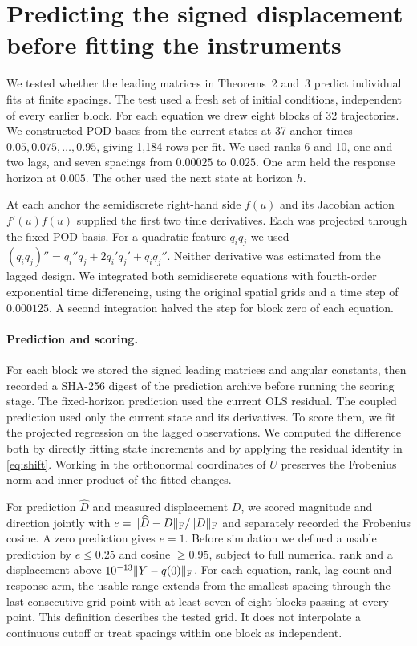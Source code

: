 \section{Predicting the signed displacement before fitting the instruments}
We tested whether the leading matrices in Theorems~2 and~3 predict individual fits at finite spacings. The test used a fresh set of initial conditions, independent of every earlier block. For each equation we drew eight blocks of 32 trajectories. We constructed POD bases from the current states at 37 anchor times $0.05,0.075,\ldots,0.95$, giving 1,184 rows per fit. We used ranks 6 and 10, one and two lags, and seven spacings from $0.00025$ to $0.025$. One arm held the response horizon at $0.005$. The other used the next state at horizon $h$.

At each anchor the semidiscrete right-hand side $f(u)$ and its Jacobian action $f'(u)f(u)$ supplied the first two time derivatives. Each was projected through the fixed POD basis. For a quadratic feature $q_iq_j$ we used $(q_iq_j)''=q_i''q_j+2q_i'q_j'+q_iq_j''$. Neither derivative was estimated from the lagged design. We integrated both semidiscrete equations with fourth-order exponential time differencing, using the original spatial grids and a time step of $0.000125$. A second integration halved the step for block zero of each equation.

\paragraph{Prediction and scoring.}
For each block we stored the signed leading matrices and angular constants, then recorded a SHA-256 digest of the prediction archive before running the scoring stage. The fixed-horizon prediction used the current OLS residual. The coupled prediction used only the current state and its derivatives. To score them, we fit the projected regression on the lagged observations. We computed the difference both by directly fitting state increments and by applying the residual identity in \eqref{eq:shift}. Working in the orthonormal coordinates of $U$ preserves the Frobenius norm and inner product of the fitted changes.

For prediction $\widehat D$ and measured displacement $D$, we scored magnitude and direction jointly with $e=\|\widehat D-D\|_{\mathrm F}/\|D\|_{\mathrm F}$ and separately recorded the Frobenius cosine. A zero prediction gives $e=1$. Before simulation we defined a usable prediction by $e\le0.25$ and cosine $\ge0.95$, subject to full numerical rank and a displacement above $10^{-13}\|Y-q(0)\|_{\mathrm F}$. For each equation, rank, lag count and response arm, the usable range extends from the smallest spacing through the last consecutive grid point with at least seven of eight blocks passing at every point. This definition describes the tested grid. It does not interpolate a continuous cutoff or treat spacings within one block as independent.

